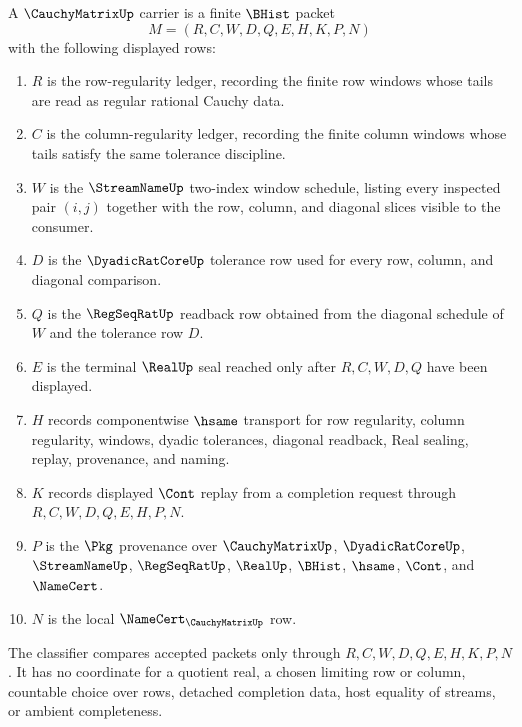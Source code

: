 \begin{definition}
\label{def:cauchy-matrix-carrier}
A $\CauchyMatrixUp$ carrier is a finite $\BHist$ packet
$$
M=(R,C,W,D,Q,E,H,K,P,N)
$$
with the following displayed rows:
\begin{enumerate}
\item $R$ is the row-regularity ledger, recording the finite row windows whose tails are read as regular rational Cauchy data.
\item $C$ is the column-regularity ledger, recording the finite column windows whose tails satisfy the same tolerance discipline.
\item $W$ is the $\StreamNameUp$ two-index window schedule, listing every inspected pair $(i,j)$ together with the row, column, and diagonal slices visible to the consumer.
\item $D$ is the $\DyadicRatCoreUp$ tolerance row used for every row, column, and diagonal comparison.
\item $Q$ is the $\RegSeqRatUp$ readback row obtained from the diagonal schedule of $W$ and the tolerance row $D$.
\item $E$ is the terminal $\RealUp$ seal reached only after $R,C,W,D,Q$ have been displayed.
\item $H$ records componentwise $\hsame$ transport for row regularity, column regularity, windows, dyadic tolerances, diagonal readback, Real sealing, replay, provenance, and naming.
\item $K$ records displayed $\Cont$ replay from a completion request through $R,C,W,D,Q,E,H,P,N$.
\item $P$ is the $\Pkg$ provenance over $\CauchyMatrixUp$, $\DyadicRatCoreUp$, $\StreamNameUp$, $\RegSeqRatUp$, $\RealUp$, $\BHist$, $\hsame$, $\Cont$, and $\NameCert$.
\item $N$ is the local $\NameCert_{\CauchyMatrixUp}$ row.
\end{enumerate}
The classifier compares accepted packets only through $R,C,W,D,Q,E,H,K,P,N$. It has no coordinate for a quotient real, a chosen limiting row or column, countable choice over rows, detached completion data, host equality of streams, or ambient completeness.
\end{definition}

